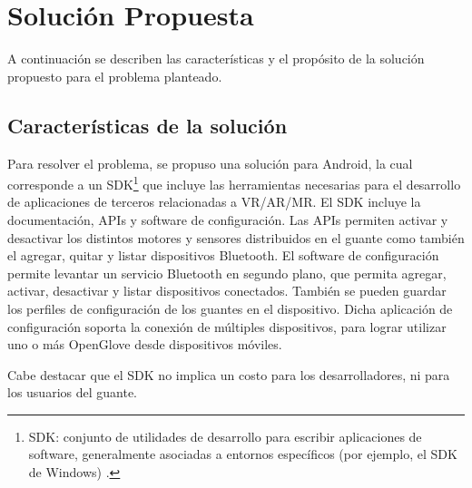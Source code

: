 \section{Solución Propuesta}
A continuación se describen las características y el propósito de la solución propuesto para el problema planteado.

\subsection{Características de la solución}
Para resolver el problema, se propuso una solución para Android, la cual corresponde a un SDK\footnote{SDK: conjunto de utilidades de desarrollo para escribir aplicaciones de software, generalmente asociadas a entornos específicos (por ejemplo, el SDK de Windows) \citep{gartner-group-SDK}.} que incluye las herramientas necesarias para el desarrollo de aplicaciones de terceros relacionadas a VR/AR/MR. El SDK incluye la documentación, APIs y software de configuración. Las APIs permiten activar y desactivar los distintos motores y sensores distribuidos en el guante como también el agregar, quitar y listar dispositivos Bluetooth. El software de configuración permite levantar un servicio Bluetooth en segundo plano, que permita agregar, activar, desactivar y listar dispositivos conectados. También se pueden guardar los perfiles de configuración de los guantes en el dispositivo. Dicha aplicación de configuración soporta  la conexión de múltiples dispositivos,  para lograr utilizar uno o más OpenGlove desde dispositivos móviles.

Cabe destacar que el SDK no implica un costo para los desarrolladores, ni para los usuarios del guante.

